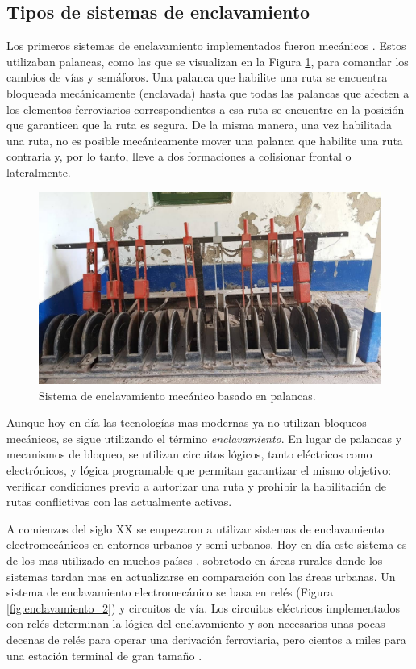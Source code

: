 \subsection{Tipos de sistemas de enclavamiento}

    Los primeros sistemas de enclavamiento implementados fueron mecánicos \cite{Paper_179}. Estos utilizaban palancas, como las que se visualizan en la Figura \ref{fig:enclavamiento_1}, para comandar los cambios de vías y semáforos. Una palanca que habilite una ruta se encuentra bloqueada mecánicamente (enclavada) hasta que todas las palancas que afecten a los elementos ferroviarios correspondientes a esa ruta se encuentre en la posición que garanticen que la ruta es segura. De la misma manera, una vez habilitada una ruta, no es posible mecánicamente mover una palanca que habilite una ruta contraria y, por lo tanto, lleve a dos formaciones a colisionar frontal o lateralmente.
    
        \begin{figure}[H]
            \centering
            \includegraphics[width=1\textwidth]{Figuras/palancas.jpg}
            \centering\caption{Sistema de enclavamiento mecánico basado en palancas.}
            \label{fig:enclavamiento_1}
        \end{figure}

    Aunque hoy en día las tecnologías mas modernas ya no utilizan bloqueos mecánicos, se sigue utilizando el término \textit{enclavamiento}. En lugar de palancas y mecanismos de bloqueo, se utilizan circuitos lógicos, tanto eléctricos como electrónicos, y lógica programable que permitan garantizar el mismo objetivo: verificar condiciones previo a autorizar una ruta y prohibir la habilitación de rutas conflictivas con las actualmente activas.

    A comienzos del siglo XX se empezaron a utilizar sistemas de enclavamiento electromecánicos en entornos urbanos y semi-urbanos. Hoy en día este sistema es de los mas utilizado en muchos países \cite{Paper_179}, sobretodo en áreas rurales donde los sistemas tardan mas en actualizarse en comparación con las áreas urbanas. Un sistema de enclavamiento electromecánico se basa en relés (Figura \ref{fig:enclavamiento_2}) y circuitos de vía. Los circuitos eléctricos implementados con relés determinan la lógica del enclavamiento y son necesarios unas pocas decenas de relés para operar una derivación ferroviaria, pero cientos a miles para una estación terminal de gran tamaño \cite{Paper_199}.

